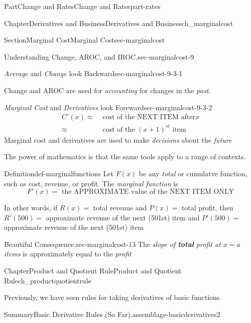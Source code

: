 \documentclass{tufte-book}
\newcommand{\alert}[1]{\textbf{\textit{#1}}}
\numberwithin{equation}{chapter}
\newcommand{\amp}{&}
\begin{document}
\begin{partptx}{Part}{Change and Rates}{}{Change and Rates}{}{}{part-rates}
\begin{chapterptx}{Chapter}{Derivatives and Business}{}{Derivatives and Business}{}{}{ch_marginalcost}
\begin{sectionptx}{Section}{Marginal Cost}{}{Marginal Cost}{}{}{sec-marginalcost}
\begin{paragraphs}{Understanding Change, AROC, and IROC.}{sec-marginalcost-9}
\begin{descriptionlist}
\begin{dlimedium}{\emph{Average} and \emph{Change} look Backward}{sec-marginalcost-9-3-1}
\par
Change and AROC are used for \emph{accounting} for changes in the \emph{past}.%
\end{dlimedium}%
\begin{dlimedium}{\emph{Marginal Cost} and \emph{Derivatives} look Foreward}{sec-marginalcost-9-3-2}%
%
\begin{align*}
C'(x) \approx \amp \text{ cost of the NEXT ITEM after} x  \\
\approx \amp \text{ cost of the } (x+1)^{st} \text{ item} 
\end{align*}
Marginal cost and derivatives are used to make \emph{decisions} about the \emph{future}%
\end{dlimedium}%
\end{descriptionlist}
\end{paragraphs}%
\par\medskip
The power of mathematics is that the same tools apply to a range of contexts.%
\begin{definition}{Definition}{}{def-marginalfunctions}%
Let \(F(x)\) be any \emph{total} or cumulatve function, such as cost, revenue, or profit. The \emph{marginal function} is%
\begin{equation*}
F'(x) = \text{ the APPROXIMATE value of the NEXT ITEM ONLY} 
\end{equation*}
%
\end{definition}
In other words, if \(R(x) = \) total revenue and \(P(x) = \) total profit, then \(R'(500) = \) approximate revenue of the next (501st) item and \(P'(500) = \) approximate revenue of the next (501st) item%
\begin{paragraphs}{Beautiful Consequence.}{sec-marginalcost-13}%
The \emph{slope of \alert{total} profit at \(x=a\) items} is approximately equal to the \emph{profit}%
\end{paragraphs}%
\end{sectionptx}
\end{chapterptx}
%
\typeout{************************************************}
\typeout{************************************************}
%
\begin{chapterptx}{Chapter}{Product and Quotient Rule}{}{Product and Quotient Rule}{}{}{ch_productquotientrule}
\renewcommand*{\chaptername}{Chapter}
\begin{introduction}{}%
Previously, we have seen rules for taking derivatives of basic functions.%
\begin{assemblage}{Summary}{Basic Derivative Rules (So Far).}{assemblage-basicderivatives2}%

\end{assemblage}
\end{introduction}
\end{chapterptx}
\end{partptx}
\end{document}
